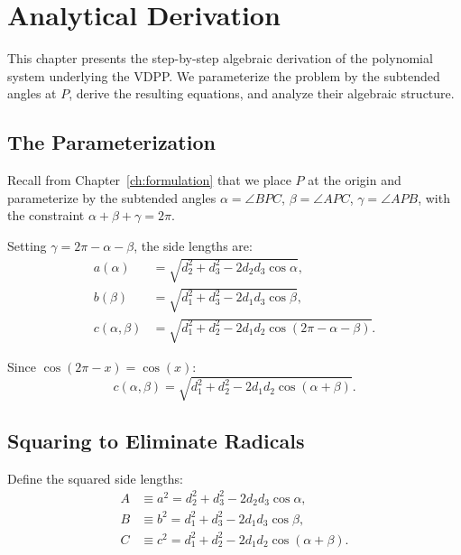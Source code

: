 
\chapter{Analytical Derivation}
\label{ch:analytical}

This chapter presents the step-by-step algebraic derivation of the polynomial system underlying the VDPP. We parameterize the problem by the subtended angles at $P$, derive the resulting equations, and analyze their algebraic structure.

\section{The Parameterization}

Recall from Chapter~\ref{ch:formulation} that we place $P$ at the origin and parameterize by the subtended angles $\alpha = \angle BPC$, $\beta = \angle APC$, $\gamma = \angle APB$, with the constraint $\alpha + \beta + \gamma = 2\pi$.

Setting $\gamma = 2\pi - \alpha - \beta$, the side lengths are:
\begin{align}
a(\alpha) &= \sqrt{d_2^2 + d_3^2 - 2d_2 d_3 \cos\alpha}, \label{eq:a-of-alpha} \\
b(\beta) &= \sqrt{d_1^2 + d_3^2 - 2d_1 d_3 \cos\beta}, \label{eq:b-of-beta} \\
c(\alpha, \beta) &= \sqrt{d_1^2 + d_2^2 - 2d_1 d_2 \cos(2\pi - \alpha - \beta)}. \label{eq:c-of-alpha-beta}
\end{align}

Since $\cos(2\pi - x) = \cos(x)$:
\begin{equation}
c(\alpha, \beta) = \sqrt{d_1^2 + d_2^2 - 2d_1 d_2 \cos(\alpha + \beta)}.
\end{equation}

\section{Squaring to Eliminate Radicals}

Define the squared side lengths:
\begin{align}
A &\equiv a^2 = d_2^2 + d_3^2 - 2d_2 d_3 \cos\alpha, \label{eq:A-sq} \\
B &\equiv b^2 = d_1^2 + d_3^2 - 2d_1 d_3 \cos\beta, \label{eq:B-sq} \\
C &\equiv c^2 = d_1^2 + d_2^2 - 2d_1 d_2 \cos(\alpha + \beta). \label{eq:C-sq}
\end{align}

